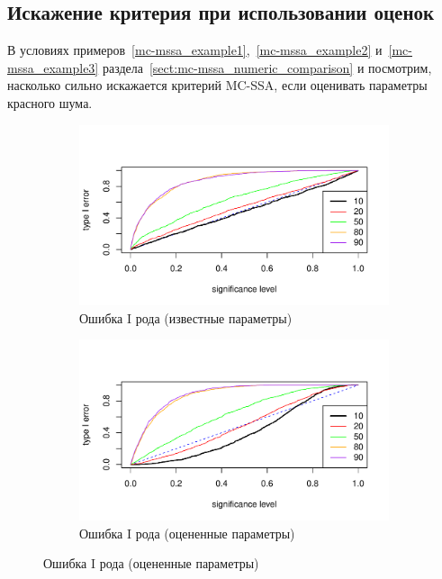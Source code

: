 \documentclass[specialist,
substylefile = spbu.rtx,
               subf,href,colorlinks=true,12pt]{disser}
\theoremstyle{definition}
\begin{document}
\subsection{Искажение критерия при использовании оценок}\label{sect:mc-ssa_est}
В условиях примеров~\ref{mc-mssa_example1},~\ref{mc-mssa_example2} и~\ref{mc-mssa_example3} раздела~\ref{sect:mc-mssa_numeric_comparison} и посмотрим, насколько сильно искажается критерий MC-SSA, если оценивать параметры красного шума.
\begin{figure}[h!]
	\captionsetup[subfigure]{justification=Centering}
	\begin{subfigure}[t]{0.5\textwidth}
		\centering
		\includegraphics[width=\textwidth]{img/type1error_phi7.pdf}
		\caption{Ошибка I рода (известные параметры)}
		\label{fig:type1error_phi7}
	\end{subfigure}\hspace{\fill}
	\begin{subfigure}[t]{0.5\textwidth}
		\centering
		\includegraphics[width=\textwidth]{img/type1error_phi7est.pdf}
		\caption{Ошибка I рода (оцененные параметры)}

\end{subfigure}
\end{figure}
\end{document}
